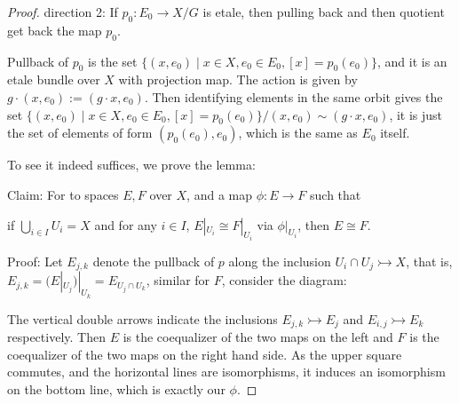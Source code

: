 \documentclass[a4paper]{article}
\begin{document}
\begin{proof}
    direction 2: If $p_0:E_0\to X/G$ is etale, then pulling back and then quotient get back the map $p_0$. 

    Pullback of $p_0$ is the set $\{(x,e_0)\mid x\in X,e_0\in E_0,[x]=p_0(e_0)\}$, and it is an etale bundle over $X$ with projection map. The action is given by $g\cdot (x,e_0):=(g\cdot x, e_0)$. Then identifying elements in the same orbit gives the set $\{(x,e_0)\mid x\in X,e_0\in E_0,[x]=p_0(e_0)\}/(x,e_0)\sim (g\cdot x,e_0)$, it is just the set of elements of form $(p_0(e_0),e_0)$, which is the same as $E_0$ itself.
    
    

    To see it indeed suffices, we prove the lemma: 

    Claim: For to spaces $E,F$ over $X$, and a map $\phi:E\to F$ such that 
    \begin{center}
    \end{center}
    
    if $\bigcup_{i\in I}U_i=X$ and for any $i\in I$, $E|_{U_i}\cong F|_{U_i}$ via $\phi|_{U_i}$, then $E\cong F$.

    Proof: Let $E_{j,k}$ denote the pullback of $p$ along the inclusion $U_i\cap U_j\rightarrowtail X$, that is, $E_{j,k}=(E|_{U_j})|_{U_k}=E_{U_j\cap U_k}$, similar for $F$, consider the diagram:

    \begin{center}
    \end{center}

    The vertical double arrows indicate the inclusions $E_{j,k}\rightarrowtail E_j$ and $E_{i,j}\rightarrowtail E_k$ respectively. Then $E$ is the coequalizer of the two maps on the left and $F$ is the coequalizer of the two maps on the right hand side. As the upper square commutes, and the horizontal lines are isomorphisms, it induces an isomorphism on the bottom line, which is exactly our $\phi$. 



\end{proof}
\end{document}
